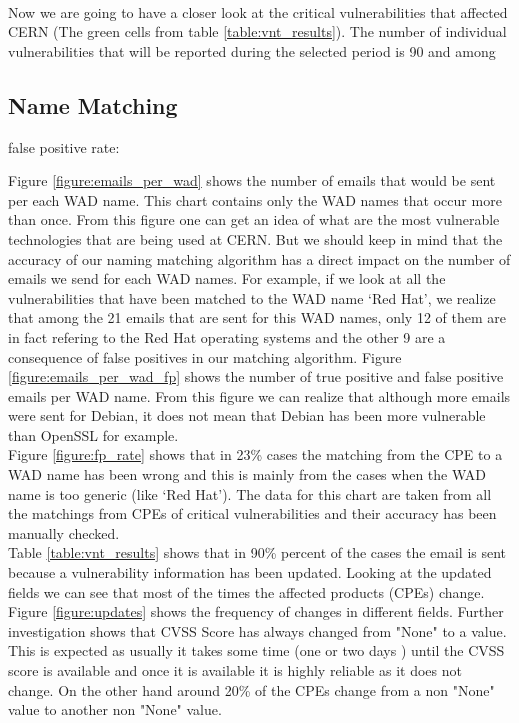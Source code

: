\paragraph{}
Now we are going to have a closer look at the critical vulnerabilities that affected CERN (The green cells from table \ref{table:vnt_results}). The number of individual vulnerabilities that will be reported during the selected period is 90 and among

\subsection{Name Matching }
false positive rate:

Figure \ref{figure:emails_per_wad} shows the number of emails that would be sent per each WAD name. This chart contains only the WAD names that occur more than once. From this figure one can get an idea of what are the most vulnerable technologies that are being used at CERN. But we should keep in mind that the accuracy of our naming matching algorithm has a direct impact on the number of emails we send for each WAD names. For example, if we look at all the vulnerabilities that have been matched to the WAD name `Red Hat', we realize that among the 21 emails that are sent for this WAD names, only 12 of them are in fact refering to the Red Hat operating systems and the  other 9 are a consequence of false positives in our matching algorithm. Figure \ref{figure:emails_per_wad_fp} shows the number of true positive and false positive emails per WAD name. From this figure we can realize that although more emails were sent for Debian, it does not mean that Debian has been more vulnerable than OpenSSL for example.
\\
Figure \ref{figure:fp_rate} shows that in 23\% cases the matching from the CPE to a WAD name has been wrong and this is mainly from the cases when the WAD name is too generic (like `Red Hat'). The data for this chart are taken from all the matchings from CPEs of critical vulnerabilities and their accuracy has been manually checked. 
\\
Table \ref{table:vnt_results} shows that in 90\% percent of the cases the email is sent because a vulnerability information has been updated. Looking at the updated fields we can see that most of the times the affected products (CPEs) change. Figure \ref{figure:updates} shows the frequency of changes in different fields. Further investigation shows that CVSS Score has always changed from "None" to a value. This is expected as usually it takes some time (one or two days	) until the CVSS score is available and once it is available it is highly reliable as it does not change. On the other hand around 20\% of the CPEs change from a non "None" value to another non "None" value.









